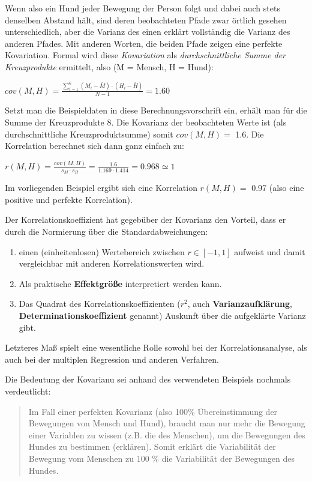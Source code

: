 \documentclass[
]{article}
\providecommand{\tightlist}{%
  \setlength{\itemsep}{0pt}\setlength{\parskip}{0pt}}
\begin{document}
Wenn also ein Hund jeder Bewegung der Person folgt und dabei auch stets denselben Abstand hält, sind deren beobachteten Pfade zwar örtlich gesehen unterschiedlich, aber die Varianz des einen erklärt vollständig die Varianz des anderen Pfades. Mit anderen Worten, die beiden Pfade zeigen eine perfekte Kovariation. Formal wird diese \emph{Kovariation} als \emph{durchschnittliche Summe der Kreuzprodukte} ermittelt, also (M = Mensch, H = Hund):

\(cov(M, H) = \frac{\sum_{i=1}^{6} (M_i - \bar{M}) \cdot (H_i - \bar{H})}{N-1} = 1.60\)

Setzt man die Beispieldaten in diese Berechnungsvorschrift ein, erhält man für die Summe der Kreuzprodukte 8. Die Kovarianz der beobachteten Werte ist (als durchschnittliche Kreuzproduktsumme) somit \(cov(M,H) =\) 1.6. Die Korrelation berechnet sich dann ganz einfach zu:

\(r(M, H) = \frac{cov(M,H)}{s_M \cdot s_H} = \frac{1.6}{1.169 \cdot 1.414} = 0.968 \simeq 1\)

Im vorliegenden Beispiel ergibt sich eine Korrelation \(r(M,H) =\) 0.97 (also eine positive und perfekte Korrelation).

Der Korrelationskoeffizient hat gegebüber der Kovarianz den Vorteil, dass er durch die Normierung über die Standardabweichungen:

\begin{enumerate}
\def\labelenumi{\arabic{enumi}.}
\tightlist
\item
  einen (einheitenlosen) Wertebereich zwischen \(r \in [-1, 1]\) aufweist und damit vergleichbar mit anderen Korrelationswerten wird.
\item
  Als praktische \textbf{Effektgröße} interpretiert werden kann.
\item
  Das Quadrat des Korrelationskoeffizienten (\(r^2\), auch \textbf{Varianzaufklärung}, \textbf{Determinationskoeffizient} genannt) Auskunft über die aufgeklärte Varianz gibt.
\end{enumerate}

Letzteres Maß spielt eine wesentliche Rolle sowohl bei der Korrelationsanalyse, als auch bei der multiplen Regression und anderen Verfahren.

Die Bedeutung der Kovarianu sei anhand des verwendeten Beispiels nochmals verdeutlicht:

\begin{quote}
Im Fall einer perfekten Kovarianz (also 100\% Übereinstimmung der Bewegungen von Mensch und Hund), braucht man nur mehr die Bewegung einer Variablen zu wissen (z.B. die des Menschen), um die Bewegungen des Hundes zu bestimmen (erklären). Somit erklärt die Variabilität der Bewegung vom Menschen zu 100 \% die Variabilität der Bewegungen des Hundes.
\end{quote}
\end{document}
